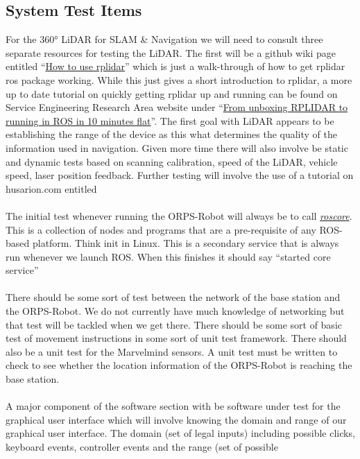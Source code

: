 \documentclass[english,12pt]{article}
\begin{document}
\subsection{System Test Items}
For the \ang{360} LiDAR for SLAM \& Navigation we will need to consult three separate 
resources for testing the LiDAR. The first will be a github wiki page entitled 
``\href{https://github.com/robopeak/rplidar_ros/wiki/How-to-use-rplidar}{How to use rplidar}'' 
which is just a walk-through of how to get rplidar ros package working. While this just gives 
a short introduction to rplidar, a more up to date tutorial on quickly getting rplidar up and 
running can be found on Service Engineering Research Area website under 
``\href{https://blog.zhaw.ch/icclab/rplidar/}{From unboxing RPLIDAR to running in ROS in 10 
minutes flat}''. The first goal with LiDAR appears to be establishing the range of the device 
as this what determines the quality of the information used in navigation. Given more time 
there will also involve be static and dynamic tests based on scanning calibration, 
speed of the LiDAR, vehicle speed, laser position feedback. Further testing will involve the use 
of a tutorial on husarion.com entitled \\\\
The initial test whenever running the ORPS-Robot will always be to call 
\href{http://wiki.ros.org/roscore}{\textit{roscore}}. 
This is a collection of nodes and programs that are a pre-requisite of any ROS-based platform. Think init 
in Linux. This is a secondary service that is always run whenever we launch ROS. When this finishes it should say 
``started core service''\\\\
There should be some sort of test between the network of the base station and the ORPS-Robot. We do not currently have much 
knowledge of networking but that test will be tackled when we get there. There should be some sort of basic 
test of movement instructions in some sort of unit test framework. There should also be a unit test for the 
Marvelmind sensors. A unit test must be written to check to see whether the location 
information of the ORPS-Robot is reaching the base station. \\\\
A major component of the software section with be software under test for the graphical user interface which 
will involve knowing the domain and range of our graphical user interface. The domain (set of legal 
inputs) including possible clicks, keyboard events, controller events and the range (set of possible 
\end{document}
